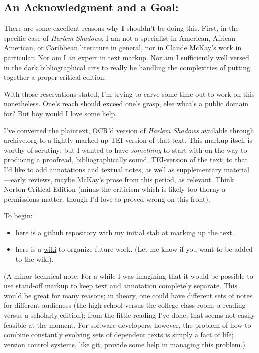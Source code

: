 \documentclass[
  12pt,
]{article}
\providecommand{\tightlist}{%
  \setlength{\itemsep}{0pt}\setlength{\parskip}{0pt}}
\begin{document}
\hypertarget{an-acknowledgment-and-a-goal}{%
\subsection{An Acknowledgment and a
Goal:}\label{an-acknowledgment-and-a-goal}}

There are some excellent reasons why \textbf{I} shouldn't be doing this.
First, in the specific case of \emph{Harlem Shadows}, I am not a
specialist in American, African American, or Caribbean literature in
general, nor in Claude McKay's work in particular. Nor am I an expert in
text markup. Nor am I sufficiently well versed in the dark
bibliographical arts to really be handling the complexities of putting
together a proper critical edition.

With those reservations stated, I'm trying to carve some time out to
work on this nonetheless. One's reach should exceed one's grasp, else
what's a public domain for? But boy would I love some help.

I've converted the plaintext, OCR'd version of \emph{Harlem Shadows}
available through archive.org to a lightly marked up TEI version of that
text. This markup itself is worthy of scrutiny; but I wanted to have
\emph{something} to start with on the way to producing a proofread,
bibliographically sound, TEI-version of the text; to that I'd like to
add annotations and textual notes, as well as supplementary
material---early reviews, maybe McKay's prose from this period, as
relevant. Think Norton Critical Edition (minus the criticism which is
likely too thorny a permissions matter; though I'd love to proved wrong
on this front).

To begin:

\begin{itemize}
\tightlist
\item
  here is a \href{http://github.com/c-forster/harlem-shadows}{github
  repository} with my initial stab at marking up the text.
\item
  here is a \href{http://harlemshadows.pbworks.com}{wiki} to organize
  future work. (Let me know if you want to be added to the wiki).
\end{itemize}

(A minor technical note: For a while I was imagining that it would be
possible to use stand-off markup to keep text and annotation completely
separate. This would be great for many reasons; in theory, one could
have different sets of notes for different audiences (the high school
versus the college class room; a reading versus a scholarly edition);
from the little reading I've done, that seems not easily feasible at the
moment. For software developers, however, the problem of how to combine
constantly evolving sets of dependent texts is simply a fact of life;
version control systems, like git, provide some help in managing this
problem.)
\end{document}
